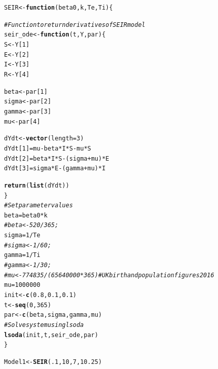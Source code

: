 \documentclass{article}\usepackage[]{graphicx}\usepackage[]{color}
\makeatletter
\newcommand{\hlnum}[1]{\textcolor[rgb]{0.686,0.059,0.569}{#1}}%
\newcommand{\hlcom}[1]{\textcolor[rgb]{0.678,0.584,0.686}{\textit{#1}}}%
\newcommand{\hlopt}[1]{\textcolor[rgb]{0,0,0}{#1}}%
\newcommand{\hlstd}[1]{\textcolor[rgb]{0.345,0.345,0.345}{#1}}%
\newcommand{\hlkwa}[1]{\textcolor[rgb]{0.161,0.373,0.58}{\textbf{#1}}}%
\newcommand{\hlkwb}[1]{\textcolor[rgb]{0.69,0.353,0.396}{#1}}%
\newcommand{\hlkwc}[1]{\textcolor[rgb]{0.333,0.667,0.333}{#1}}%
\newcommand{\hlkwd}[1]{\textcolor[rgb]{0.737,0.353,0.396}{\textbf{#1}}}%
\newenvironment{kframe}{%
 \def\at@end@of@kframe{}%
 \ifinner\ifhmode%
  \def\at@end@of@kframe{\end{minipage}}%
  \begin{minipage}{\columnwidth}%
 \fi\fi%
 \def\FrameCommand##1{\hskip\@totalleftmargin \hskip-\fboxsep
 \colorbox{shadecolor}{##1}\hskip-\fboxsep
     \hskip-\linewidth \hskip-\@totalleftmargin \hskip\columnwidth}%
 \MakeFramed {\advance\hsize-\width
   \@totalleftmargin\z@ \linewidth\hsize
   \@setminipage}}%
 {\par\unskip\endMakeFramed%
 \at@end@of@kframe}
\newenvironment{knitrout}{}{} %
\makeatother
\begin{document}
\begin{knitrout}
\color{fgcolor}\begin{kframe}
\begin{alltt}
\hlstd{SEIR} \hlkwb{<-} \hlkwa{function}\hlstd{(}\hlkwc{beta0}\hlstd{,} \hlkwc{k}\hlstd{,} \hlkwc{Te}\hlstd{,} \hlkwc{Ti}\hlstd{)\{}

\hlcom{# Function to return derivatives of SEIR model}
\hlstd{seir_ode}\hlkwb{<-}\hlkwa{function}\hlstd{(}\hlkwc{t}\hlstd{,}\hlkwc{Y}\hlstd{,}\hlkwc{par}\hlstd{)\{}
  \hlstd{S}\hlkwb{<-}\hlstd{Y[}\hlnum{1}\hlstd{]}
  \hlstd{E}\hlkwb{<-}\hlstd{Y[}\hlnum{2}\hlstd{]}
  \hlstd{I}\hlkwb{<-}\hlstd{Y[}\hlnum{3}\hlstd{]}
  \hlstd{R}\hlkwb{<-}\hlstd{Y[}\hlnum{4}\hlstd{]}

  \hlstd{beta}\hlkwb{<-}\hlstd{par[}\hlnum{1}\hlstd{]}
  \hlstd{sigma}\hlkwb{<-}\hlstd{par[}\hlnum{2}\hlstd{]}
  \hlstd{gamma}\hlkwb{<-}\hlstd{par[}\hlnum{3}\hlstd{]}
  \hlstd{mu}\hlkwb{<-}\hlstd{par[}\hlnum{4}\hlstd{]}

  \hlstd{dYdt}\hlkwb{<-}\hlkwd{vector}\hlstd{(}\hlkwc{length}\hlstd{=}\hlnum{3}\hlstd{)}
  \hlstd{dYdt[}\hlnum{1}\hlstd{]}\hlkwb{=}\hlstd{mu}\hlopt{-}\hlstd{beta}\hlopt{*}\hlstd{I}\hlopt{*}\hlstd{S}\hlopt{-}\hlstd{mu}\hlopt{*}\hlstd{S}
  \hlstd{dYdt[}\hlnum{2}\hlstd{]}\hlkwb{=}\hlstd{beta}\hlopt{*}\hlstd{I}\hlopt{*}\hlstd{S}\hlopt{-}\hlstd{(sigma}\hlopt{+}\hlstd{mu)}\hlopt{*}\hlstd{E}
  \hlstd{dYdt[}\hlnum{3}\hlstd{]}\hlkwb{=}\hlstd{sigma}\hlopt{*}\hlstd{E}\hlopt{-}\hlstd{(gamma}\hlopt{+}\hlstd{mu)}\hlopt{*}\hlstd{I}

  \hlkwd{return}\hlstd{(}\hlkwd{list}\hlstd{(dYdt))}
\hlstd{\}}
  \hlcom{# Set parameter values}
\hlstd{beta} \hlkwb{=} \hlstd{beta0}\hlopt{*}\hlstd{k}
\hlcom{#beta<-520/365;}
\hlstd{sigma} \hlkwb{=} \hlnum{1}\hlopt{/}\hlstd{Te}
\hlcom{# sigma<-1/60;}
\hlstd{gamma} \hlkwb{=} \hlnum{1}\hlopt{/}\hlstd{Ti}
\hlcom{# gamma<-1/30;}
\hlcom{# mu<-774835/(65640000*365) # UK birth and population figures 2016}
\hlstd{mu}\hlkwb{=}\hlnum{1000000}
\hlstd{init}\hlkwb{<-}\hlkwd{c}\hlstd{(}\hlnum{0.8}\hlstd{,}\hlnum{0.1}\hlstd{,}\hlnum{0.1}\hlstd{)}
\hlstd{t}\hlkwb{<-}\hlkwd{seq}\hlstd{(}\hlnum{0}\hlstd{,}\hlnum{365}\hlstd{)}
\hlstd{par}\hlkwb{<-}\hlkwd{c}\hlstd{(beta,sigma,gamma,mu)}
\hlcom{# Solve system using lsoda}
\hlkwd{lsoda}\hlstd{(init,t,seir_ode,par)}
\hlstd{\}}

\hlstd{Model1} \hlkwb{<-} \hlkwd{SEIR}\hlstd{(}\hlnum{.1}\hlstd{,} \hlnum{10}\hlstd{,} \hlnum{7}\hlstd{,} \hlnum{10.25}\hlstd{)}
\end{alltt}
\end{kframe}
\end{knitrout}
\end{document}
